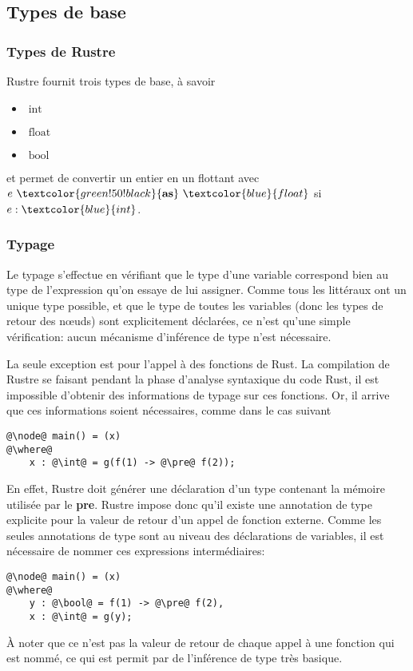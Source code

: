 \documentclass{scrartcl}
\DeclareMathOperator{\tint}{int}
\DeclareMathOperator{\tfloat}{float}
\DeclareMathOperator{\tbool}{bool}
\newcommand{\keyword}[1]{{\textcolor{green!50!black}{\textbf{#1}}}}
\newcommand{\type}[1]{\textcolor{blue}{#1}}
\newcommand{\pre}{\keyword{pre}}
\renewcommand{\int}{\type{int}}
\newcommand{\float}{\type{float}}
\newcommand{\as}{\keyword{as}}
\begin{document}
\subsection{Types de base}
\subsubsection{Types de Rustre}
Rustre fournit trois types de base, à savoir
\begin{itemize}
\item \(\tint\)
\item \(\tfloat\)
\item \(\tbool\)
\end{itemize}
et permet de convertir un entier en un flottant avec \(e\ \as\ \float\) si \(e:\int\).

\subsubsection{Typage}
Le typage s'effectue en vérifiant que le type d'une variable correspond bien au type de
l'expression qu'on essaye de lui assigner. Comme tous les littéraux ont un unique type possible,
et que le type de toutes les variables (donc les types de retour des n\oe{}uds) sont
explicitement déclarées, ce n'est qu'une simple vérification: aucun mécanisme d'inférence de type
n'est nécessaire.

La seule exception est pour l'appel à des fonctions de Rust. La compilation de Rustre se faisant
pendant la phase d'analyse syntaxique du code Rust, il est impossible d'obtenir des informations
de typage sur ces fonctions. Or, il arrive que ces informations soient nécessaires, comme dans
le cas suivant
\begin{verbatim}
@\node@ main() = (x)
@\where@
    x : @\int@ = g(f(1) -> @\pre@ f(2));
\end{verbatim}
En effet, Rustre doit générer une déclaration d'un type contenant la mémoire utilisée par le
\pre{}. Rustre impose donc qu'il existe une annotation de type explicite pour la valeur de retour
d'un appel de fonction externe. Comme les seules annotations de type sont au niveau des
déclarations de variables, il est nécessaire de nommer ces expressions intermédiaires:
\begin{verbatim}
@\node@ main() = (x)
@\where@
    y : @\bool@ = f(1) -> @\pre@ f(2),
    x : @\int@ = g(y);
\end{verbatim}
À noter que ce n'est pas la valeur de retour de chaque appel à une fonction qui est nommé, ce qui
est permit par de l'inférence de type très basique.
\end{document}
